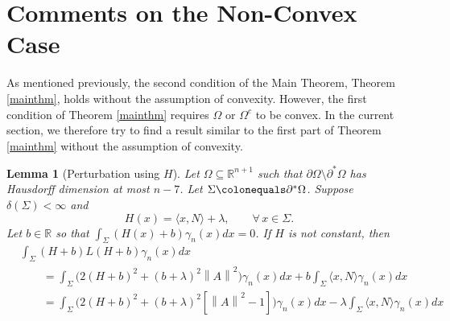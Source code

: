 \documentclass[12pt,reqno]{amsart}
\newtheorem{lemma}[theorem]{Lemma}
\theoremstyle{definition}
\renewcommand{\subset}{\subseteq}
\newcommand{\vnormt}[1]{\left\|#1\right\|}    %
\newcommand{\R}{\mathbb{R}}
\newcommand{\redA}{\partial^{*}\Omega}
\newcommand{\sdimn}{n}
\newcommand{\adimn}{n+1}
\newcommand{\scon}{\lambda}
\begin{document}
\section{Comments on the Non-Convex Case}\label{secal}

As mentioned previously, the second condition of the Main Theorem, Theorem \ref{mainthm}, holds without the assumption of convexity.  However, the first condition of Theorem \ref{mainthm} requires $\Omega$ or $\Omega^{c}$ to be convex.  In the current section, we therefore try to find a result similar to the first part of Theorem \ref{mainthm} without the assumption of convexity.



\begin{lemma}[Perturbation using $H$]\label{lemma31}
Let $\Omega\subset\R^{\adimn}$ such that $\partial\Omega\setminus\redA$ has Hausdorff dimension at most $\sdimn-7$.  Let $\Sigma\colonequals\redA$.  Suppose $\delta(\Sigma)<\infty$ and
\begin{equation}\label{three0p}
H(x)=\langle x,N\rangle+\scon,\qquad\forall\,x\in\Sigma.
\end{equation}
Let $b\in\R$ so that $\int_{\Sigma}(H(x)+b)\gamma_{\sdimn}(x)dx=0$.  If $H$ is not constant, then
\begin{equation}\label{three87}
\begin{aligned}
&\int_{\Sigma}(H+b)L(H+b)\gamma_{\sdimn}(x)dx\\
&\qquad=\int_{\Sigma}\Big(2(H+b)^{2}+(b+\scon)^{2}\vnormt{A}^{2}\Big)\gamma_{\sdimn}(x)dx
+b\int_{\Sigma}\langle x,N\rangle\gamma_{\sdimn}(x)dx\\
&\qquad=\int_{\Sigma}\Big(2(H+b)^{2}+(b+\scon)^{2}[\vnormt{A}^{2}-1]\Big)\gamma_{\sdimn}(x)dx
-\scon\int_{\Sigma}\langle x,N\rangle\gamma_{\sdimn}(x)dx\\
\end{aligned}
\end{equation}
\end{lemma}
\end{document}
